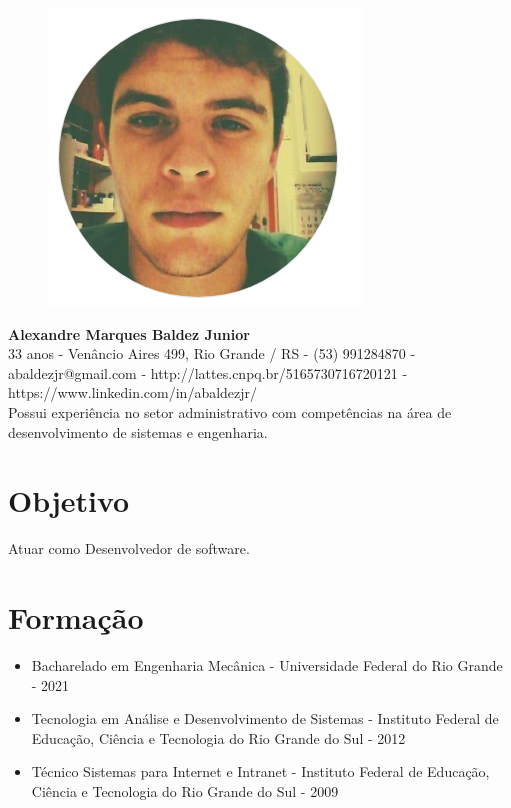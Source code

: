 \documentclass[11pt,oneside,a4paper]{article}
\begin{document}
    \thispagestyle{empty}
    \begin{figure}
        \centering
        \includegraphics[scale = 0.3]{img/perfil-red.png}        
    \end{figure}
    \begin{flushleft}
    \textbf{\Large {Alexandre Marques Baldez Junior}}\\
    \vspace{0.5cm}
    33 anos - Venâncio Aires 499, Rio Grande / RS - (53) 991284870 - abaldezjr@gmail.com - http://lattes.cnpq.br/5165730716720121 - https://www.linkedin.com/in/abaldezjr/\\
    \vspace{0.5cm}
    Possui experiência no setor administrativo com competências na área de desenvolvimento de sistemas e engenharia.\\
    \end{flushleft}    
    \section*{Objetivo}
    Atuar como Desenvolvedor de software.
    \section*{Formação}
    \begin{itemize}
        \item Bacharelado em Engenharia Mecânica - Universidade Federal do Rio Grande - 2021
        \item Tecnologia em Análise e Desenvolvimento de Sistemas - Instituto Federal de Educação, Ciência e Tecnologia do Rio Grande do Sul - 2012
        \item Técnico Sistemas para Internet e Intranet - Instituto Federal de Educação, Ciência e Tecnologia do Rio Grande do Sul - 2009
    \end{itemize}
\end{document}
